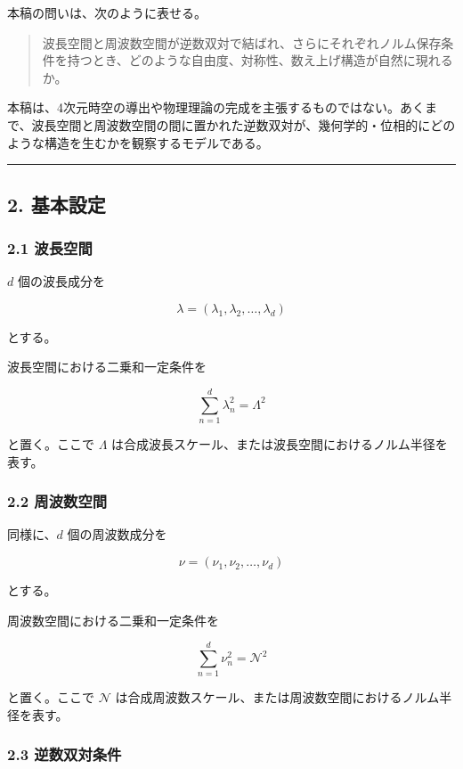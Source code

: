 \documentclass[
]{ltjsarticle}
\begin{document}
本稿の問いは、次のように表せる。

\begin{quote}
波長空間と周波数空間が逆数双対で結ばれ、さらにそれぞれノルム保存条件を持つとき、どのような自由度、対称性、数え上げ構造が自然に現れるか。
\end{quote}

本稿は、4次元時空の導出や物理理論の完成を主張するものではない。あくまで、波長空間と周波数空間の間に置かれた逆数双対が、幾何学的・位相的にどのような構造を生むかを観察するモデルである。

\begin{center}\rule{0.5\linewidth}{0.5pt}\end{center}

\subsection{2. 基本設定}\label{ux57faux672cux8a2dux5b9a}

\subsubsection{2.1 波長空間}\label{ux6ce2ux9577ux7a7aux9593}

\(d\) 個の波長成分を

\[
\lambda=(\lambda_1,\lambda_2,\ldots,\lambda_d)
\]

とする。

波長空間における二乗和一定条件を

\[
\sum_{n=1}^{d} \lambda_n^2=\Lambda^2
\]

と置く。ここで \(\Lambda\)
は合成波長スケール、または波長空間におけるノルム半径を表す。

\subsubsection{2.2 周波数空間}\label{ux5468ux6ce2ux6570ux7a7aux9593}

同様に、\(d\) 個の周波数成分を

\[
\nu=(\nu_1,\nu_2,\ldots,\nu_d)
\]

とする。

周波数空間における二乗和一定条件を

\[
\sum_{n=1}^{d} \nu_n^2=\mathcal{N}^2
\]

と置く。ここで \(\mathcal{N}\)
は合成周波数スケール、または周波数空間におけるノルム半径を表す。

\subsubsection{2.3
逆数双対条件}\label{ux9006ux6570ux53ccux5bfeux6761ux4ef6}
\end{document}
